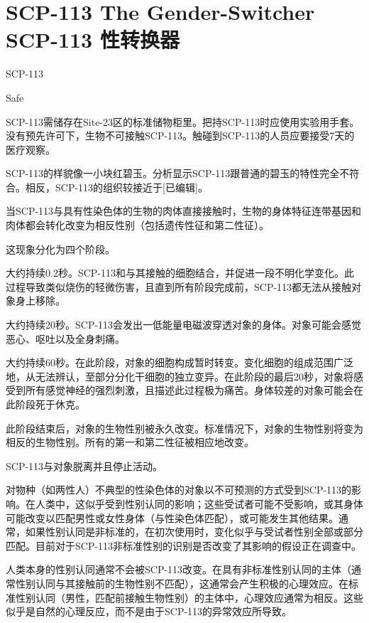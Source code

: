 \chapter[SCP-113 性转换器]{
    SCP-113 The Gender-Switcher\\
    SCP-113 性转换器
}

\label{chap:SCP-113}

SCP-113

Safe

SCP-113需储存在Site-23区的标准储物柜里。把持SCP-113时应使用实验用手套。没有预先许可下，生物不可接触SCP-113。触碰到SCP-113的人员应要接受7天的医疗观察。

SCP-113的样貌像一小块红碧玉。分析显示SCP-113跟普通的碧玉的特性完全不符合。相反，SCP-113的组织较接近于{[}已编辑]。

当SCP-113与具有性染色体的生物的肉体直接接触时，生物的身体特征连带基因和肉体都会转化改变为相反性别（包括遗传性征和第二性征）。

这现象分化为四个阶段。

大约持续0.2秒。SCP-113和与其接触的细胞结合，并促进一段不明化学变化。此过程导致类似烧伤的轻微伤害，且直到所有阶段完成前，SCP-113都无法从接触对象身上移除。

大约持续20秒。SCP-113会发出一低能量电磁波穿透对象的身体。对象可能会感觉恶心、呕吐以及全身刺痛。

大约持续60秒。在此阶段，对象的细胞构成暂时转变。变化细胞的组成范围广泛地，从无法辨认，至部分分化干细胞的独立变异。在此阶段的最后20秒，对象将感受到所有感觉神经的强烈刺激，且描述此过程极为痛苦。身体较差的对象可能会在此阶段死于休克。

此阶段结束后，对象的生物性别被永久改变。标准情况下，对象的生物性别将变为相反的生物性别。所有的第一和第二性征被相应地改变。

SCP-113与对象脱离并且停止活动。

对物种（如两性人）不典型的性染色体的对象以不可预测的方式受到SCP-113的影响。在人类中，这似乎受到性别认同的影响；这些受试者可能不受影响，或其身体可能改变以匹配男性或女性身体（与性染色体匹配），或可能发生其他结果。通常，如果性别认同是非标准的，在初次使用时，变化似乎与受试者性别全部或部分匹配。目前对于SCP-113非标准性别的识别是否改变了其影响的假设正在调查中。

人类本身的性别认同通常不会被SCP-113改变。在具有非标准性别认同的主体（通常性别认同与其接触前的生物性别不匹配），这通常会产生积极的心理效应。在标准性别认同（男性，匹配前接触生物性别）的主体中，心理效应通常为相反。这些似乎是自然的心理反应，而不是由于SCP-113的异常效应所导致。

